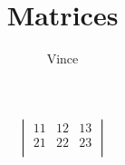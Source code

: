 \documentclass{article}
\title{Matrices}
\author{Vince}
\begin{document}
\maketitle


\[
\begin{vmatrix}
11&12&13\\
21&22&23\\
\end{vmatrix}
\]
\end{document}
